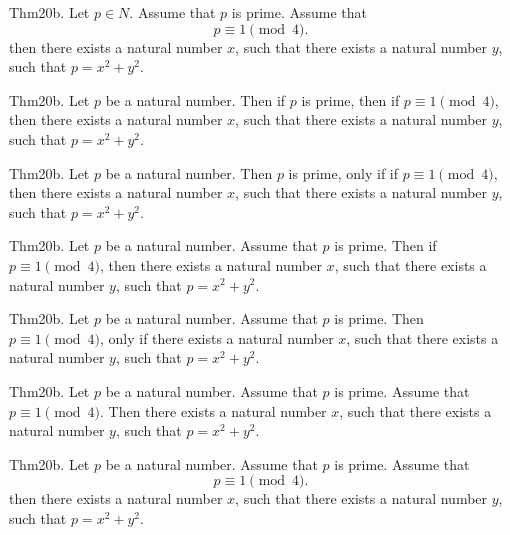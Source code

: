 \documentclass{article}
\begin{document}
Thm20b. Let $p \in N$. Assume that $p$ is prime. Assume that $$p \equiv 1 \pmod{ 4}.$$ then there exists a natural number $x$, such that there exists a natural number $y$, such that $p = x ^{ 2}+ y ^{ 2}$.

Thm20b. Let $p$ be a natural number. Then if $p$ is prime, then if $p \equiv 1 \pmod{ 4}$, then there exists a natural number $x$, such that there exists a natural number $y$, such that $p = x ^{ 2}+ y ^{ 2}$.

Thm20b. Let $p$ be a natural number. Then $p$ is prime, only if if $p \equiv 1 \pmod{ 4}$, then there exists a natural number $x$, such that there exists a natural number $y$, such that $p = x ^{ 2}+ y ^{ 2}$.

Thm20b. Let $p$ be a natural number. Assume that $p$ is prime. Then if $p \equiv 1 \pmod{ 4}$, then there exists a natural number $x$, such that there exists a natural number $y$, such that $p = x ^{ 2}+ y ^{ 2}$.

Thm20b. Let $p$ be a natural number. Assume that $p$ is prime. Then $p \equiv 1 \pmod{ 4}$, only if there exists a natural number $x$, such that there exists a natural number $y$, such that $p = x ^{ 2}+ y ^{ 2}$.

Thm20b. Let $p$ be a natural number. Assume that $p$ is prime. Assume that $p \equiv 1 \pmod{ 4}$. Then there exists a natural number $x$, such that there exists a natural number $y$, such that $p = x ^{ 2}+ y ^{ 2}$.

Thm20b. Let $p$ be a natural number. Assume that $p$ is prime. Assume that $$p \equiv 1 \pmod{ 4}.$$ then there exists a natural number $x$, such that there exists a natural number $y$, such that $p = x ^{ 2}+ y ^{ 2}$.
\end{document}

